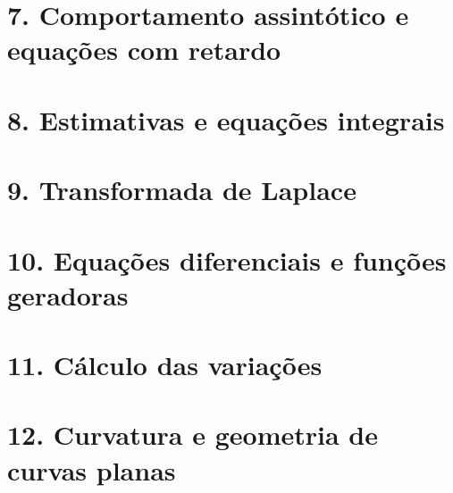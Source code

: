 \documentclass[11pt,a4paper]{amsart}
\begin{document}
\section*{7. Comportamento assintótico e equações com retardo}


\section*{8. Estimativas e equações integrais}


\section*{9. Transformada de Laplace}


\section*{10. Equações diferenciais e funções geradoras}


\section*{11. Cálculo das variações}


\section*{12. Curvatura e geometria de curvas planas}

\end{document}
